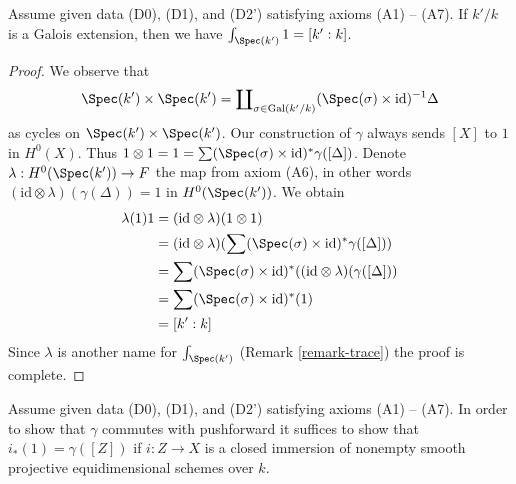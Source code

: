 \begin{lemma}
\label{lemma-integrate-1}
Assume given data (D0), (D1), and (D2') satisfying axioms (A1) -- (A7).
If $k'/k$ is a Galois extension, then we have
$\int_{\Spec(k')} 1 = [k' : k]$.
\end{lemma}

\begin{proof}
We observe that
$$
\Spec(k') \times \Spec(k') =
\coprod\nolimits_{\sigma \in \text{Gal}(k'/k)}
(\Spec(\sigma) \times \text{id})^{-1} \Delta
$$
as cycles on $\Spec(k') \times \Spec(k')$.
Our construction of $\gamma$ always sends $[X]$ to $1$ in $H^0(X)$. Thus
$1 \otimes 1 = 1 = \sum (\Spec(\sigma) \times \text{id})^*\gamma([\Delta])$.
Denote $\lambda : H^0(\Spec(k')) \to F$ the map from
axiom (A6), in other words $(\text{id} \otimes \lambda)(\gamma(\Delta)) = 1$
in $H^0(\Spec(k'))$. We obtain
\begin{align*}
\lambda(1) 1
& =
(\text{id} \otimes \lambda)(1 \otimes 1) \\
& =
(\text{id} \otimes \lambda)(
\sum (\Spec(\sigma) \times \text{id})^*\gamma([\Delta])) \\
& =
\sum (\Spec(\sigma) \times \text{id})^*(
(\text{id} \otimes \lambda)(\gamma([\Delta])) \\
& =
\sum (\Spec(\sigma) \times \text{id})^*(1) \\
& =
[k' : k]
\end{align*}
Since $\lambda$ is another name for $\int_{\Spec(k')}$
(Remark \ref{remark-trace}) the proof is complete.
\end{proof}

\begin{lemma}
\label{lemma-enough}
Assume given data (D0), (D1), and (D2') satisfying axioms (A1) -- (A7).
In order to show that $\gamma$ commutes with pushforward it suffices
to show that $i_*(1) = \gamma([Z])$ if $i : Z \to X$ is a closed
immersion of nonempty smooth projective equidimensional schemes over $k$.
\end{lemma}

